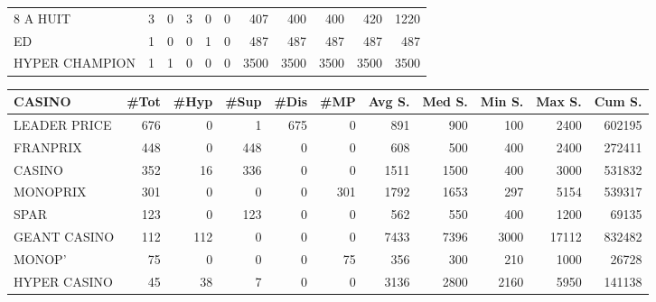 \documentclass[11pt]{article}
\begin{document}
\begin{table}[H]
\begin{tabular}{lrrrrrrrrrr}
8 A HUIT           &          3 &          0 &          3 &          0 &          0 &        407 &        400 &        400 &        420 &       1220 \\
ED                 &          1 &          0 &          0 &          1 &          0 &        487 &        487 &        487 &        487 &        487 \\
HYPER CHAMPION     &          1 &          1 &          0 &          0 &          0 &       3500 &       3500 &       3500 &       3500 &       3500 \\
\bottomrule
\end{tabular}
\end{table}

\begin{table}[H]
\footnotesize
\setlength{\tabcolsep}{2pt}
\begin{tabular}{lrrrrrrrrrr}
\toprule
CASINO &       \#Tot &       \#Hyp &       \#Sup &       \#Dis &        \#MP &     Avg S. &     Med S. &     Min S. &     Max S. &     Cum S. \\
\midrule
LEADER PRICE     &        676 &          0 &          1 &        675 &          0 &        891 &        900 &        100 &       2400 &     602195 \\
FRANPRIX         &        448 &          0 &        448 &          0 &          0 &        608 &        500 &        400 &       2400 &     272411 \\
CASINO           &        352 &         16 &        336 &          0 &          0 &       1511 &       1500 &        400 &       3000 &     531832 \\
MONOPRIX         &        301 &          0 &          0 &          0 &        301 &       1792 &       1653 &        297 &       5154 &     539317 \\
SPAR             &        123 &          0 &        123 &          0 &          0 &        562 &        550 &        400 &       1200 &      69135 \\
GEANT CASINO     &        112 &        112 &          0 &          0 &          0 &       7433 &       7396 &       3000 &      17112 &     832482 \\
MONOP'           &         75 &          0 &          0 &          0 &         75 &        356 &        300 &        210 &       1000 &      26728 \\
HYPER CASINO     &         45 &         38 &          7 &          0 &          0 &       3136 &       2800 &       2160 &       5950 &     141138 \\

\end{tabular}
\end{table}
\end{document}
